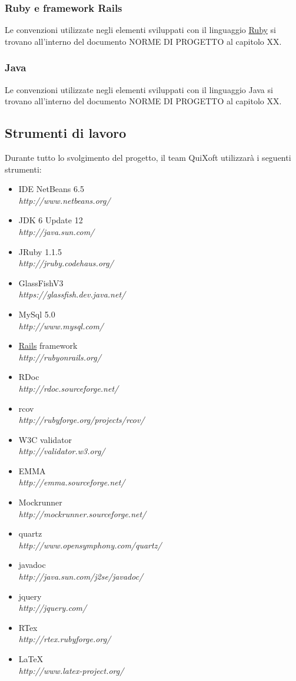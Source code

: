 \documentclass[11pt,a4paper]{article}
\begin{document}
\subsubsection{Ruby e framework Rails}
Le convenzioni utilizzate negli elementi sviluppati con il linguaggio \underline{Ruby} si trovano all'interno del documento NORME DI PROGETTO al capitolo XX.
\subsubsection{Java}
Le convenzioni utilizzate negli elementi sviluppati con il linguaggio Java si trovano all'interno del documento NORME DI PROGETTO al capitolo XX.

\subsection{Strumenti di lavoro}
Durante tutto lo svolgimento del progetto, il team QuiXoft utilizzarà i seguenti strumenti:
\begin{itemize}
 \item IDE NetBeans 6.5 \\ \textit{http://www.netbeans.org/}
 \item JDK 6 Update 12 \\ \textit{http://java.sun.com/}
 \item JRuby 1.1.5 \\ \textit{http://jruby.codehaus.org/}
 \item GlassFishV3 \\ \textit{https://glassfish.dev.java.net/}
 \item MySql 5.0 \\ \textit{http://www.mysql.com/}
 \item \underline{Rails} framework \\ \textit{http://rubyonrails.org/}
 \item RDoc \\ \textit{http://rdoc.sourceforge.net/}
 \item rcov \\ \textit{http://rubyforge.org/projects/rcov/}
 \item W3C validator \\ \textit {http://validator.w3.org/}
 \item EMMA \\ \textit {http://emma.sourceforge.net/}
 \item Mockrunner \\ \textit{http://mockrunner.sourceforge.net/}
 \item quartz \\ \textit {http://www.opensymphony.com/quartz/}
 \item javadoc \\ \textit {http://java.sun.com/j2se/javadoc/}
 \item jquery \\ \textit {http://jquery.com/}
 \item RTex \\ \textit {http://rtex.rubyforge.org/}
 \item \LaTeX \\ \textit {http://www.latex-project.org/}
\end{itemize}
\end{document}
